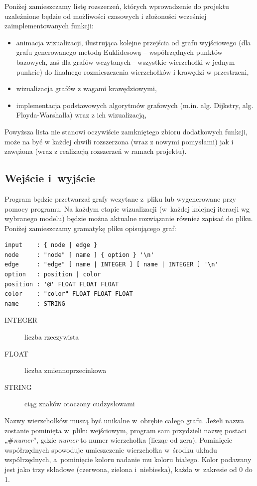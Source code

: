 \documentclass[a4paper,onecolumn,oneside,12pt]{mwart}
\begin{document}
Poniżej zamieszczamy listę rozszerzeń, których wprowadzenie do projektu
uzależnione będzie od możliwości czasowych i złożoności wcześniej
zaimplementowanych funkcji:
\begin{itemize}
	\item animacja wizualizacji, ilustrująca kolejne przejścia od grafu
		wyjściowego (dla grafu generowanego metodą Euklidesową --
		współrzędnych punktów bazowych, zaś dla grafów wczytanych -
		wszystkie wierzchołki w jednym punkcie) do finalnego rozmieszczenia
		wierzchołków i krawędzi w przestrzeni,
	\item wizualizacja grafów z wagami krawędziowymi,
	\item implementacja podstawowych algorytmów grafowych (m.in. alg.
		Dijkstry, alg. Floyda-Warshalla) wraz z ich wizualizacją,
\end{itemize}

Powyższa lista nie stanowi oczywiście zamkniętego zbioru dodatkowych
funkcji, może na być w każdej chwili rozszerzona (wraz z nowymi pomysłami)
jak i zawężona (wraz z realizacją rozszerzeń w ramach projektu).

\subsection{Wejście i~wyjście}

Program będzie przetwarzał grafy wczytane z~pliku lub wygenerowane przy
pomocy programu. Na każdym etapie wizualizacji (w~każdej kolejnej iteracji
wg wybranego modelu) będzie można aktualne rozwiązanie również zapisać do
pliku. Poniżej zamieszczamy gramatykę pliku opisującego graf:

\begin{verbatim}
input    : { node | edge }
node     : "node" [ name ] { option } '\n'
edge     : "edge" [ name | INTEGER ] [ name | INTEGER ] '\n'
option   : position | color
position : '@' FLOAT FLOAT FLOAT
color    : "color" FLOAT FLOAT FLOAT
name     : STRING
\end{verbatim}

\begin{description}
	\item[INTEGER] liczba rzeczywista
	\item[FLOAT] liczba zmiennoprzecinkowa
	\item[STRING] ciąg znaków otoczony cudzysłowami
\end{description}

Nazwy wierzchołków muszą być unikalne w~obrębie całego grafu. Jeżeli nazwa
zostanie pominięta w~pliku wejściowym, program sam przydzieli nazwę postaci
„\#{\it numer}”, gdzie {\it numer} to numer wierzchołka (licząc od zera).
Pominięcie współrzędnych spowoduje umieszczenie wierzchołka w~środku układu
współrzędnych, a~pominięcie koloru nadanie mu koloru białego. Kolor podawany
jest jako trzy składowe (czerwona, zielona i~niebieska), każda w~zakresie
od 0 do 1.
\end{document}
